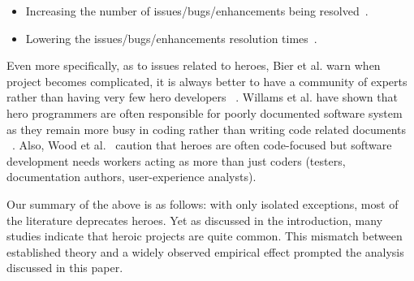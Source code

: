 \documentclass[smallextended]{svjour3}
\newcommand{\bi}{\begin{itemize}}
\newcommand{\ei}{\end{itemize}}
\begin{document}
\bi
\item Increasing the number of issues/bugs/enhancements being resolved~\cite{mockus2002two,jarczyk2014github,bissyande2013got,athanasiou2014test,gupta2014process,reyes2017analyzing}.
\item Lowering the issues/bugs/enhancements resolution times~\cite{jarczyk2014github}.
\ei
Even more specifically, as to issues related to heroes, Bier et al. warn when project becomes complicated, it is always better to have a community of experts rather than having very few hero developers ~\cite{bier2011online}. Willams et al. have shown that hero programmers are often responsible for poorly documented software system as they remain more busy in coding rather than writing code related documents ~\cite{hislop2002integrating}.  Also, Wood et al.~\cite{wood2005multiview} caution that heroes are often code-focused but software development needs workers acting as more than just coders (testers, documentation authors, user-experience analysts).

Our summary of the above is as follows: with only isolated exceptions, most of the literature deprecates heroes. Yet as discussed in the introduction,
many studies indicate that heroic projects are quite common. This mismatch between
established theory and a widely observed empirical effect prompted the analysis
discussed in this paper.
 
\end{document}
